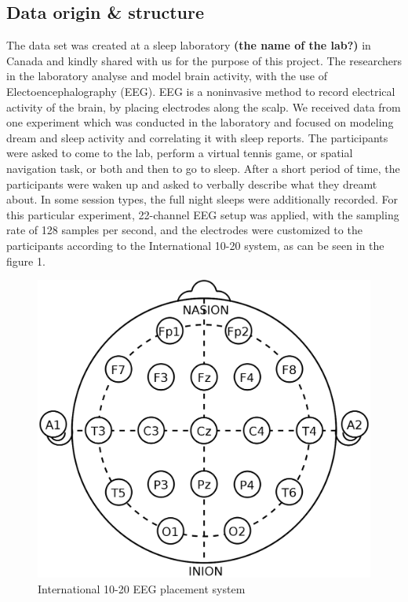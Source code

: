 \documentclass{article}
\begin{document}
\subsection{Data origin \& structure}
The data set was created at a sleep laboratory \textbf{(the name of the lab?)} in Canada and kindly shared with us for the purpose of this project. The researchers in the laboratory analyse and model brain activity, with the use of Electoencephalography (EEG). EEG is a noninvasive method to record electrical activity of the brain, by placing electrodes along the scalp. We received data from one experiment which was conducted in the laboratory and focused on modeling dream and sleep activity and correlating it with sleep reports. The participants were asked to come to the lab, perform a virtual tennis game, or spatial navigation task, or both and then to go to sleep. After a short period of time, the participants were waken up and asked to verbally describe what they dreamt about. In some session types, the full night sleeps were additionally recorded. For this particular experiment, 22-channel EEG setup was applied, with the sampling rate of 128 samples per second, and the electrodes were customized to the participants according to the International 10-20 system, as can be seen in the figure 1.
\begin{figure}
	\centering
	\includegraphics[scale=0.1]{eeg}
	\caption{International 10-20 EEG placement system}
\end{figure} 
\end{document}
